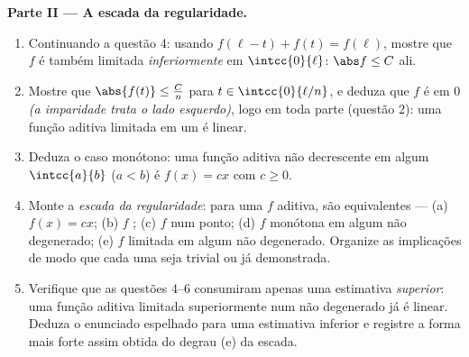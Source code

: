 \begin{problem}[{Problema de fim de semana --- $f(x + y) = f(x) + f(y)$:
a regularidade força a linearidade, e o retrato dos monstros}]
\medskip
\noindent\textbf{Parte II --- A escada da regularidade.}
\begin{enumerate}
  \item Continuando a questão 4: usando $f(\ell - t) + f(t) =
        f(\ell)$, mostre que $f$ é também limitada \emph{inferiormente} em
        $\intcc{0}{\ell}$: $\abs f \leq C$ ali.
  \item Mostre que $\abs{f(t)} \leq \frac{C}{n}$ para $t \in
        \intcc{0}{\ell/n}$, e deduza que $f$ é  em
        $0$ \emph{(a imparidade trata o lado esquerdo)}, logo
        em toda parte (questão 2): uma função aditiva limitada em
        um  é linear.
  \item Deduza o caso monótono: uma função aditiva
        não decrescente em algum $\intcc{a}{b}$ ($a < b$) é $f(x)
        = cx$ com $c \geq 0$.
  \item Monte a \emph{escada da regularidade}: para uma $f$
        aditiva, são equivalentes --- (a) $f(x) = cx$;
        (b) $f$ ; (c) $f$  num ponto; (d)
        $f$ monótona em algum  não degenerado; (e) $f$
        limitada em algum  não degenerado. Organize as
        implicações de modo que cada uma seja trivial ou já
        demonstrada.
  \item Verifique que as questões 4--6 consumiram apenas uma
        estimativa \emph{superior}: uma função aditiva limitada
        superiormente num  não degenerado já é linear. Deduza
        o enunciado espelhado para uma estimativa inferior e registre
        a forma mais forte assim obtida do degrau (e) da escada.
\end{enumerate}


\end{problem}
